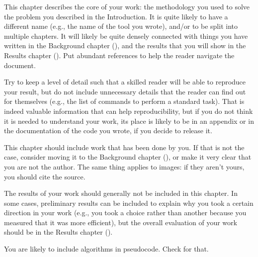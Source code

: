 This chapter describes the core of your work: the methodology you used
to solve the problem you described in the Introduction. It is quite
likely to have a different name (e.g., the name of the tool you wrote),
and/or to be split into multiple chapters. It will likely be quite
densely connected with things you have written in the Background chapter
(), and the results that you will show in the
Results chapter (). Put abundant references to help
the reader navigate the document.

Try to keep a level of detail such that a skilled reader will be able to
reproduce your result, but do not include unnecessary details that the
reader can find out for themselves (e.g., the list of commands to
perform a standard task). That is indeed valuable information that can
help reproducibility, but if you do not think it is needed to understand
your work, its place is likely to be in an appendix or in the
documentation of the code you wrote, if you decide to release it.

This chapter should include work that has been done by you. If that is
not the case, consider moving it to the Background chapter
(), or make it very clear that you are not the
author. The same thing applies to images: if they aren't yours, you
should cite the source.

The results of your work should generally not be included in this
chapter. In some cases, preliminary results can be included to explain
why you took a certain direction in your work (e.g., you took a choice
rather than another because you measured that it was more efficient),
but the overall evaluation of your work should be in the Results chapter
().

You are likely to include algorithms in pseudocode. Check
for that.
